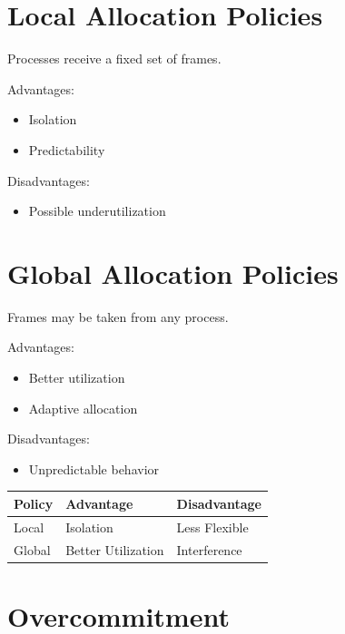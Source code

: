 \section{Local Allocation Policies}

Processes receive a fixed set of frames.

Advantages:

\begin{itemize}
\item Isolation
\item Predictability
\end{itemize}

Disadvantages:

\begin{itemize}
\item Possible underutilization
\end{itemize}

\section{Global Allocation Policies}

Frames may be taken from any process.

Advantages:

\begin{itemize}
\item Better utilization
\item Adaptive allocation
\end{itemize}

Disadvantages:

\begin{itemize}
\item Unpredictable behavior
\end{itemize}

\begin{center}
\begin{tabular}{lll}
\toprule
Policy & Advantage & Disadvantage\\
\midrule
Local & Isolation & Less Flexible\\
Global & Better Utilization & Interference\\
\bottomrule
\end{tabular}
\end{center}

\section{Overcommitment}

